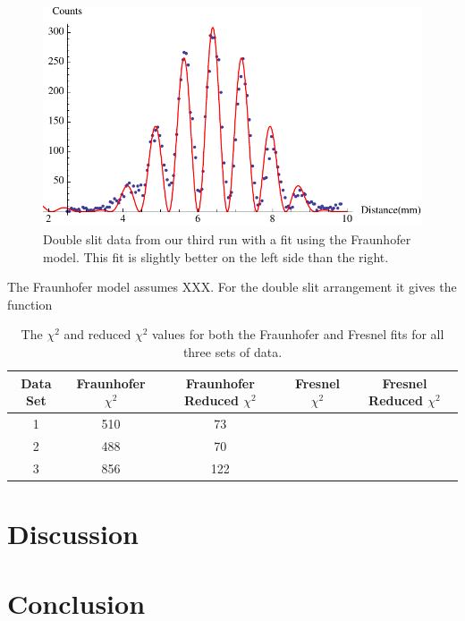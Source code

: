 \documentclass[prb,preprint]{revtex4-1}
\begin{document}
\begin{figure}[h!]
\centering
\includegraphics[width=6in]{doublefraun3.pdf}
\caption{Double slit data from our third run with a fit using the Fraunhofer model. This fit is slightly better on the left side than the right.}
\label{doublefraun3}
\end{figure}

The Fraunhofer model assumes XXX. For the double slit arrangement it gives the function

\begin{table}[h!]
\centering
\caption{The $\chi^2$ and reduced $\chi^2$ values for both the Fraunhofer and Fresnel fits for all three sets of data.}
\begin{ruledtabular}
\begin{tabular}{c c c c c}
Data Set & Fraunhofer $\chi^2$ & Fraunhofer Reduced $\chi^2$ & Fresnel $\chi^2$ & Fresnel Reduced $\chi^2$ \\
\hline	
1 & 510 &   73 &  &   \\
2 & 488 &   70 &  &   \\
3 & 856 & 122 &  &   \\

\end{tabular}
\end{ruledtabular}
\label{neon_dvs}
\end{table}


\section{Discussion}


\section{Conclusion}
\end{document}
